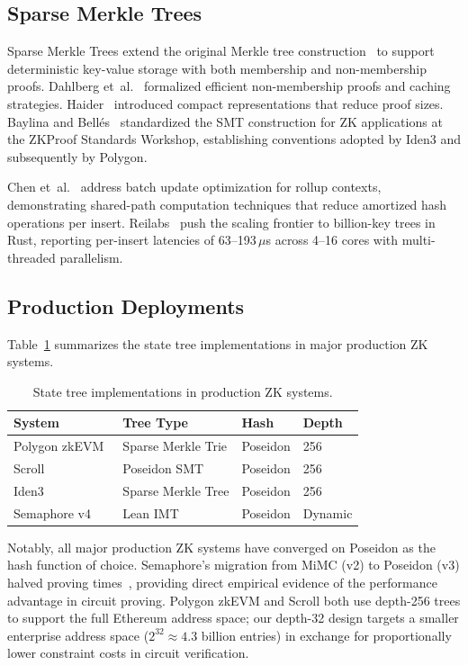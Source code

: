 \subsection{Sparse Merkle Trees}

Sparse Merkle Trees extend the original Merkle tree construction~\cite{merkle1987digital} to support deterministic key-value storage with both membership and non-membership proofs. Dahlberg et~al.~\cite{dahlberg2016efficient} formalized efficient non-membership proofs and caching strategies. Haider~\cite{haider2018compact} introduced compact representations that reduce proof sizes. Baylina and Bell\'{e}s~\cite{baylina2019smt} standardized the SMT construction for ZK applications at the ZKProof Standards Workshop, establishing conventions adopted by Iden3 and subsequently by Polygon.

Chen et~al.~\cite{chen2023batch} address batch update optimization for rollup contexts, demonstrating shared-path computation techniques that reduce amortized hash operations per insert. Reilabs~\cite{reilabs2024largesmt} push the scaling frontier to billion-key trees in Rust, reporting per-insert latencies of 63--193\,$\mu$s across 4--16 cores with multi-threaded parallelism.

\subsection{Production Deployments}

Table~\ref{tab:production-systems} summarizes the state tree implementations in major production ZK systems.

\begin{table}[htbp]
\centering
\caption{State tree implementations in production ZK systems.}
\label{tab:production-systems}
\begin{tabular}{llll}
\hline
\textbf{System} & \textbf{Tree Type} & \textbf{Hash} & \textbf{Depth} \\
\hline
Polygon zkEVM~\cite{polygon2024smt} & Sparse Merkle Trie & Poseidon & 256 \\
Scroll~\cite{scroll2024poseidonsmt} & Poseidon SMT & Poseidon & 256 \\
Iden3~\cite{iden3smt} & Sparse Merkle Tree & Poseidon & 256 \\
Semaphore v4~\cite{semaphore2024v4} & Lean IMT & Poseidon & Dynamic \\
\hline
\end{tabular}
\end{table}

Notably, all major production ZK systems have converged on Poseidon as the hash function of choice. Semaphore's migration from MiMC (v2) to Poseidon (v3) halved proving times~\cite{semaphore2024v4}, providing direct empirical evidence of the performance advantage in circuit proving. Polygon zkEVM and Scroll both use depth-256 trees to support the full Ethereum address space; our depth-32 design targets a smaller enterprise address space ($2^{32} \approx 4.3$ billion entries) in exchange for proportionally lower constraint costs in circuit verification.
